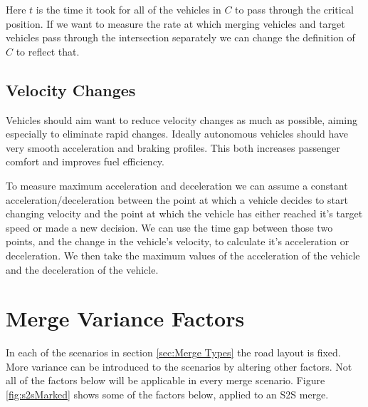 Here $t$ is the time it took for all of the vehicles in $C$ to pass through the critical position. If we want to measure the rate at which merging vehicles and target vehicles pass through the intersection separately we can change the definition of $C$ to reflect that.

\subsection{Velocity Changes}
\label{subsec:Velocity Changes}
Vehicles should aim want to reduce velocity changes as much as possible, aiming especially to eliminate rapid changes. Ideally autonomous vehicles should have very smooth acceleration and braking profiles. This both increases passenger comfort and improves fuel efficiency.

To measure maximum acceleration and deceleration we can assume a constant acceleration/deceleration between the point at which a vehicle decides to start changing velocity and the point at which the vehicle has either reached it's target speed or made a new decision. We can use the time gap between those two points, and the change in the vehicle's velocity, to calculate it's acceleration or deceleration. We then take the maximum values of the acceleration of the vehicle and the deceleration of the vehicle.

\section{Merge Variance Factors}
\label{sec:Merge Variance Factors}

In each of the scenarios in section \ref{sec:Merge Types} the road layout is fixed. More variance can be introduced to the scenarios by altering other factors. Not all of the factors below will be applicable in every merge scenario. Figure \ref{fig:s2sMarked} shows some of the factors below, applied to an S2S merge.

